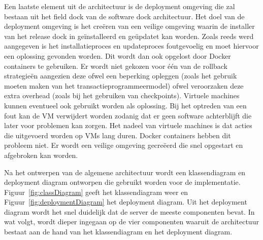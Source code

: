 Een laatste element uit de architectuur is de deployment omgeving die zal bestaan uit het field dock van de software dock architectuur.
Het doel van de deployment omgeving is het creëren van een veilige omgeving waarin de installer van het release dock in geïnstalleerd en geüpdatet kan worden.
Zoals reeds werd aangegeven is het installatieproces en updateproces foutgevoelig en moet hiervoor een oplossing gevonden worden.
Dit wordt dan ook opgelost door Docker containers te gebruiken.
Er wordt niet gekozen voor één van de rollback strategieën aangezien deze ofwel een beperking opleggen (zoals het gebruik moeten maken van het transactieprogrammeermodel) ofwel veroorzaken deze extra overhead (zoals bij het gebruiken van checkpoints).
Virtuele machines kunnen eventueel ook gebruikt worden als oplossing.
Bij het optreden van een fout kan de VM verwijdert worden zodanig dat er geen software achterblijft die later voor problemen kan zorgen.
Het nadeel van virtuele machines is dat acties die uitgevoerd worden op VMs lang duren.
Docker containers hebben dit probleem niet.
Er wordt een veilige omgeving gecreëerd die snel opgestart en afgebroken kan worden.

Na het ontwerpen van de algemene architectuur wordt een klassendiagram en deployment diagram ontworpen die gebruikt worden voor de implementatie.
Figuur~\vref{fig:classDiagram} geeft het klassendiagram weer en Figuur~\vref{fig:deploymentDiagram} het deployment diagram.
Uit het deployment diagram wordt het snel duidelijk dat de server de meeste componenten bevat.
In wat volgt, wordt dieper ingegaan op de vier componenten waaruit de architectuur bestaat aan de hand van het klassendiagram en het deployment diagram.

